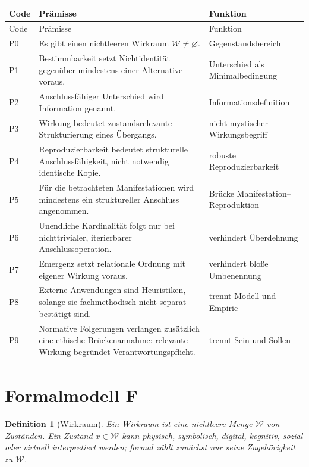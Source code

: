 \documentclass[11pt,a4paper]{article}
\newtheorem{definition}{Definition}[section]
\theoremstyle{remark}
\newcommand{\W}{\mathcal{W}}
\begin{document}
\begin{longtable}{>{\raggedright\arraybackslash}p{}p{}p{}}
\toprule
Code & Prämisse & Funktion \\
\midrule
\endfirsthead
\toprule
Code & Prämisse & Funktion \\
\midrule
\endhead
P0 & Es gibt einen nichtleeren Wirkraum $\W\neq\varnothing$. & Gegenstandsbereich \\
P1 & Bestimmbarkeit setzt Nichtidentität gegenüber mindestens einer Alternative voraus. & Unterschied als Minimalbedingung \\
P2 & Anschlussfähiger Unterschied wird Information genannt. & Informationsdefinition \\
P3 & Wirkung bedeutet zustandsrelevante Strukturierung eines Übergangs. & nicht-mystischer Wirkungsbegriff \\
P4 & Reproduzierbarkeit bedeutet strukturelle Anschlussfähigkeit, nicht notwendig identische Kopie. & robuste Reproduzierbarkeit \\
P5 & Für die betrachteten Manifestationen wird mindestens ein struktureller Anschluss angenommen. & Brücke Manifestation--Reproduktion \\
P6 & Unendliche Kardinalität folgt nur bei nichttrivialer, iterierbarer Anschlussoperation. & verhindert Überdehnung \\
P7 & Emergenz setzt relationale Ordnung mit eigener Wirkung voraus. & verhindert bloße Umbenennung \\
P8 & Externe Anwendungen sind Heuristiken, solange sie fachmethodisch nicht separat bestätigt sind. & trennt Modell und Empirie \\
P9 & Normative Folgerungen verlangen zusätzlich eine ethische Brückenannahme: relevante Wirkung begründet Verantwortungspflicht. & trennt Sein und Sollen \\
\bottomrule
\end{longtable}

\section{Formalmodell F}

\begin{definition}[Wirkraum]
Ein Wirkraum ist eine nichtleere Menge $\W$ von Zuständen. Ein Zustand $x\in\W$ kann physisch, symbolisch, digital, kognitiv, sozial oder virtuell interpretiert werden; formal zählt zunächst nur seine Zugehörigkeit zu $\W$.
\end{definition}
\end{document}
